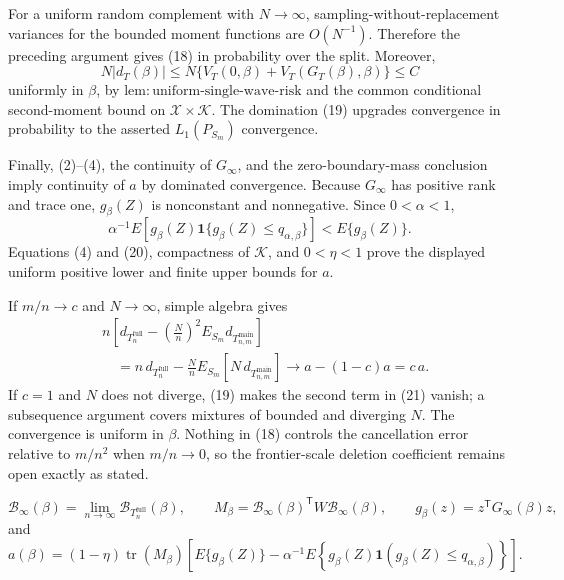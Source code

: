 For a uniform random complement with \(N\to\infty\), sampling-without-replacement variances for the bounded moment functions are \(O(N^{-1})\).  Therefore the preceding argument gives (18) in probability over the split.  Moreover,
\[
N|d_T(\beta)|
\leq N\{V_T(0,\beta)+V_T(G_T(\beta),\beta)\}\leq C
\tag{19}
\]
uniformly in \(\beta\), by
\(\mathrm{lem{:}uniform\text{-}single\text{-}wave\text{-}risk}\) and the common conditional second-moment bound on \(\mathcal X\times\mathcal K\).  The domination (19) upgrades convergence in probability to the asserted \(L_1(P_{S_m})\) convergence.

Finally, (2)--(4), the continuity of \(G_\infty\), and the zero-boundary-mass conclusion imply continuity of \(a\) by dominated convergence.  Because \(G_\infty\) has positive rank and trace one, \(g_\beta(Z)\) is nonconstant and nonnegative.  Since \(0<\alpha<1\),
\[
\alpha^{-1}E\!\left[
g_\beta(Z)\mathbf 1\{g_\beta(Z)\leq q_{\alpha,\beta}\}
\right]
<E\{g_\beta(Z)\}.
\tag{20}
\]
Equations (4) and (20), compactness of \(\mathcal K\), and \(0<\eta<1\) prove the displayed uniform positive lower and finite upper bounds for \(a\).

If \(m/n\to c\) and \(N\to\infty\), simple algebra gives
\[
\begin{aligned}
&n\left[
d_{T_n^{\mathrm{full}}}
-\left(\frac Nn\right)^2E_{S_m}d_{T_{n,m}^{\mathrm{main}}}
\right]\\
&\quad=
n\,d_{T_n^{\mathrm{full}}}
-\frac Nn E_{S_m}\left[
N\,d_{T_{n,m}^{\mathrm{main}}}
\right]
\longrightarrow a-(1-c)a=c\,a.
\end{aligned}
\tag{21}
\]
If \(c=1\) and \(N\) does not diverge, (19) makes the second term in (21) vanish; a subsequence argument covers mixtures of bounded and diverging \(N\).  The convergence is uniform in \(\beta\).  Nothing in (18) controls the cancellation error relative to \(m/n^2\) when \(m/n\to0\), so the frontier-scale deletion coefficient remains open exactly as stated.

\[
\mathcal B_\infty(\beta)
=\lim_{n\to\infty}\mathcal B_{T_n^{\mathrm{full}}}(\beta),
\qquad
M_\beta
=\mathcal B_\infty(\beta)^{\mathsf T}W\mathcal B_\infty(\beta),
\qquad
g_\beta(z)=z^{\mathsf T}G_\infty(\beta)z,
\]
and
\[
a(\beta)
=(1-\eta)\operatorname{tr}(M_\beta)
\left[
E\{g_\beta(Z)\}
-\alpha^{-1}E\!\left\{
g_\beta(Z)\mathbf 1(g_\beta(Z)\leq q_{\alpha,\beta})
\right\}
\right].
\]

